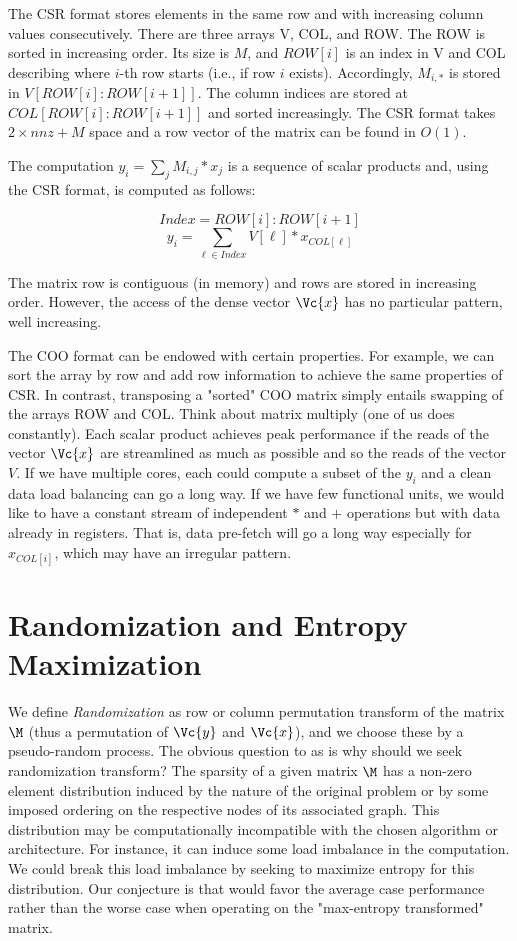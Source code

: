 \documentclass[manuscript,screen]{acmart}
\begin{document}
The CSR format stores elements in the same row and with increasing
column values consecutively. There are three arrays V, COL, and
ROW. The ROW is sorted in increasing order.  Its size is $M$, and
$ROW[i]$ is an index in V and COL describing where $i$-th row starts
(i.e., if row $i$ exists).  Accordingly, $M_{i,*}$ is stored in
$V[ROW[i]:ROW[i+1]]$. The column indices are stored at
$COL[ROW[i]:ROW[i+1]]$ and sorted increasingly. The CSR format takes
$2\times nnz + M$ space and a row vector of the matrix can be found in
$O(1)$.

The computation  $y_i = \sum_j M_{i,j}*x_j$ is a sequence of scalar
products and, using the CSR format, is computed as follows:

\[ Index = ROW[i]:ROW[i+1] \]
\[
y_i =  \sum_{\ell\in Index} V[\ell] * x_{COL[\ell]}  
\]

The matrix row is contiguous (in memory) and rows are stored in
increasing order. However, the access of the dense vector $\Vc{x}$ has
no particular pattern, well increasing.

The COO format can be endowed with certain properties. For example, we
can sort the array by row and add row information to achieve the same
properties of CSR. In contrast, transposing a "sorted" COO matrix
simply entails swapping of the arrays ROW and COL. Think about matrix
multiply (one of us does constantly).  Each scalar product achieves
peak performance if the reads of the vector $\Vc{x}$ are streamlined
as much as possible and so the reads of the vector $V$. If we have
multiple cores, each could compute a subset of the $y_i$ and a clean
data load balancing can go a long way. If we have few functional
units, we would like to have a constant stream of independent $*$ and
$+$ operations but with data already in registers. That is, data
pre-fetch will go a long way especially for $x_{COL[i]}$, which may
have an irregular pattern.


\section{Randomization and Entropy Maximization}
\label{sec:randomization}
We define {\em Randomization} as row or column permutation transform
of the matrix $\M$ (thus a permutation of $\Vc{y}$ and $\Vc{x}$), and
we choose these by a pseudo-random process. The obvious question to as
is why should we seek randomization transform?  The sparsity of a
given matrix $\M$ has a non-zero element distribution induced by the
nature of the original problem or by some imposed ordering on the
respective nodes of its associated graph.  This distribution may be
computationally incompatible with the chosen algorithm or
architecture. For instance, it can induce some load imbalance in the
computation.  We could break this load imbalance by seeking to
maximize entropy for this distribution. Our conjecture is that would
favor the average case performance rather than the worse case when
operating on the "max-entropy transformed" matrix.
\end{document}
